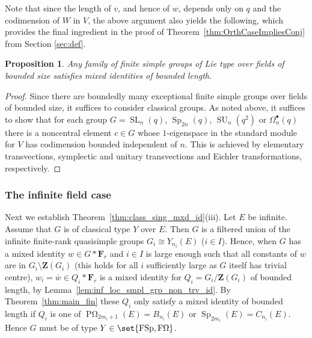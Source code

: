 \documentclass[a4paper,12pt]{amsproc}
\DeclareMathOperator{\Sp}{Sp}%
\DeclareMathOperator{\SU}{SU}%
\DeclareMathOperator{\SL}{SL}%
\DeclareMathOperator{\POmega}{P\Omega}%
\DeclareMathOperator{\FSp}{FSp}%
\DeclareMathOperator{\FOmega}{F\Omega}%
\theoremstyle{plain}
\newtheorem{proposition}[definition]{Proposition}
\theoremstyle{definition}
\begin{document}
Note that since the length of $v$, and hence of $w$, depends only on $q$ and the codimension of $W$ in $V$, the above argument also yields the following, which provides the final ingredient in the proof of Theorem~\ref{thm:OrthCaseImpliesConj} from Section \ref{sec:def}.

\begin{proposition} \label{BddFieldSizeProp}
Any family of finite simple groups of Lie type over fields of bounded size satisfies mixed identities of bounded length.
\end{proposition}

\begin{proof}
Since there are boundedly many exceptional finite simple groups over fields of bounded size, it suffices to consider classical groups. As noted above, it suffices to show that for each group $G = \SL_n(q)$, $\Sp_{2n}(q)$, $\SU_n(q^2)$ or $\Omega_n^\bullet(q)$ there is a noncentral element $c \in G$ whose $1$-eigenspace in the standard module for $V$ has codimension bounded independent of $n$. 
This is achieved by elementary transvections, symplectic and unitary transvections and Eichler transformations, respectively.
\end{proof}


\subsubsection{The infinite field case}

Next we establish Theorem~\ref{thm:class_sing_mxd_id}(iii). Let $E$ be infinite. Assume that $G$ is of classical type $Y$ over $E$. Then $G$ is a filtered union of the infinite finite-rank quasisimple groups $G_i\cong Y_{n_i}(E)$ ($i\in I$). 
Hence, when $G$ has a mixed identity $w\in G\ast\mathbf{F}_r$ and $i\in I$ is large enough such that all constants of $w$ are in $G_i\setminus\mathbf{Z}(G_i)$ (this holds for all $i$ sufficiently large as $G$ itself has trivial centre), $w_i=\overline{w}\in Q_i\ast\mathbf{F}_r$ is a mixed identity for $Q_i=G_i/\mathbf{Z}(G_i)$ of bounded length, by Lemma~\ref{lem:inf_loc_smpl_grp_non_trv_id}. By Theorem~\ref{thm:main_fin} these $Q_i$ only satisfy a mixed identity of bounded length if $Q_i$ is one of $\POmega_{2m_i+1}(E)=B_{n_i}(E)$ or $\Sp_{2m_i}(E)=C_{n_i}(E)$. Hence $G$ must be of type $Y\in\set{\FSp,\FOmega}$.
\end{document}
